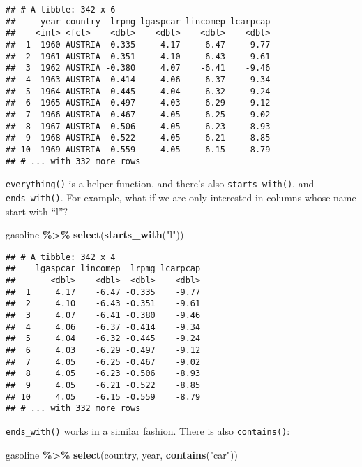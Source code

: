 \documentclass[
]{article}
\newenvironment{Shaded}{\begin{snugshade}}{\end{snugshade}}
\newcommand{\KeywordTok}[1]{\textcolor[rgb]{0.13,0.29,0.53}{\textbf{#1}}}
\newcommand{\NormalTok}[1]{#1}
\newcommand{\OperatorTok}[1]{\textcolor[rgb]{0.81,0.36,0.00}{\textbf{#1}}}
\newcommand{\StringTok}[1]{\textcolor[rgb]{0.31,0.60,0.02}{#1}}
\begin{document}
\begin{verbatim}
## # A tibble: 342 x 6
##     year country  lrpmg lgaspcar lincomep lcarpcap
##    <int> <fct>    <dbl>    <dbl>    <dbl>    <dbl>
##  1  1960 AUSTRIA -0.335     4.17    -6.47    -9.77
##  2  1961 AUSTRIA -0.351     4.10    -6.43    -9.61
##  3  1962 AUSTRIA -0.380     4.07    -6.41    -9.46
##  4  1963 AUSTRIA -0.414     4.06    -6.37    -9.34
##  5  1964 AUSTRIA -0.445     4.04    -6.32    -9.24
##  6  1965 AUSTRIA -0.497     4.03    -6.29    -9.12
##  7  1966 AUSTRIA -0.467     4.05    -6.25    -9.02
##  8  1967 AUSTRIA -0.506     4.05    -6.23    -8.93
##  9  1968 AUSTRIA -0.522     4.05    -6.21    -8.85
## 10  1969 AUSTRIA -0.559     4.05    -6.15    -8.79
## # ... with 332 more rows
\end{verbatim}

\texttt{everything()} is a helper function, and there's also \texttt{starts\_with()},
and \texttt{ends\_with()}. For example, what if we are only interested
in columns whose name start with ``l''?

\begin{Shaded}
\begin{Highlighting}[]
\NormalTok{gasoline }\OperatorTok{\%\textgreater{}\%}\StringTok{ }\KeywordTok{select}\NormalTok{(}\KeywordTok{starts\_with}\NormalTok{(}\StringTok{"l"}\NormalTok{))}
\end{Highlighting}
\end{Shaded}

\begin{verbatim}
## # A tibble: 342 x 4
##    lgaspcar lincomep  lrpmg lcarpcap
##       <dbl>    <dbl>  <dbl>    <dbl>
##  1     4.17    -6.47 -0.335    -9.77
##  2     4.10    -6.43 -0.351    -9.61
##  3     4.07    -6.41 -0.380    -9.46
##  4     4.06    -6.37 -0.414    -9.34
##  5     4.04    -6.32 -0.445    -9.24
##  6     4.03    -6.29 -0.497    -9.12
##  7     4.05    -6.25 -0.467    -9.02
##  8     4.05    -6.23 -0.506    -8.93
##  9     4.05    -6.21 -0.522    -8.85
## 10     4.05    -6.15 -0.559    -8.79
## # ... with 332 more rows
\end{verbatim}

\texttt{ends\_with()} works in a similar fashion. There is also \texttt{contains()}:

\begin{Shaded}
\begin{Highlighting}[]
\NormalTok{gasoline }\OperatorTok{\%\textgreater{}\%}\StringTok{ }\KeywordTok{select}\NormalTok{(country, year, }\KeywordTok{contains}\NormalTok{(}\StringTok{"car"}\NormalTok{))}
\end{Highlighting}
\end{Shaded}
\end{document}
